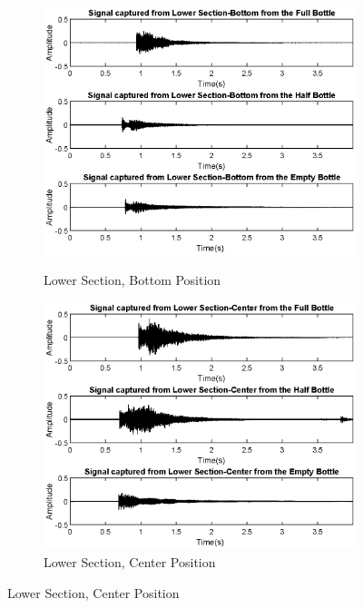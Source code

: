 \begin{figure}[]
    \centering
    \begin{subfigure}{0.45\textwidth}
        \centering
        \includegraphics[width=\linewidth]{Chapters/6CHP/Figures/TimeLowBottom.eps}
        \caption{Lower Section, Bottom Position}{}
        \label{subfig:timeLowBotMic}
    \end{subfigure}
    \begin{subfigure}{0.45\textwidth}
        \centering
        \includegraphics[width=\linewidth]{Chapters/6CHP/Figures/TimeLowCenter.eps}
        \caption{Lower Section, Center Position}{}

\end{subfigure}
\end{figure}

